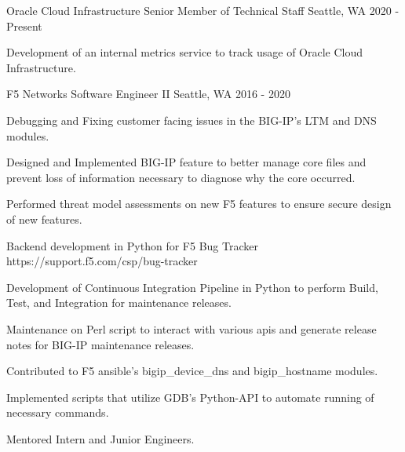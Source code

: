 

\begin{cventries}

\cventry
{Oracle Cloud Infrastructure} %
{Senior Member of Technical Staff} %
{Seattle, WA} %
{2020 - Present} %
{
  \begin{cvitems} %
    \item {Development of an internal metrics service to track usage of Oracle Cloud Infrastructure.}
  \end{cvitems}
}

  \cventry
    {F5 Networks} %
    {Software Engineer II} %
    {Seattle, WA} %
    {2016 - 2020} %
    {
      \begin{cvitems} %
        \item {Debugging and Fixing customer facing issues in the BIG-IP's LTM and DNS modules.}
        \item {Designed and Implemented BIG-IP feature to better manage core files and prevent loss of information necessary to diagnose why the core occurred.}
        \item {Performed threat model assessments on new F5 features to ensure secure design of new features.}
        \item {Backend development in Python for F5 Bug Tracker https://support.f5.com/csp/bug-tracker}
        \item {Development of Continuous Integration Pipeline in Python to perform Build, Test, and Integration for maintenance releases.}
        \item {Maintenance on Perl script to interact with various apis and generate release notes for BIG-IP maintenance releases.}
        \item {Contributed to F5 ansible's bigip\_device\_dns and bigip\_hostname modules.}
        \item {Implemented scripts that utilize GDB's Python-API to automate running of necessary commands.}
        \item {Mentored Intern and Junior Engineers.}
      \end{cvitems}
    }


\end{cventries}
